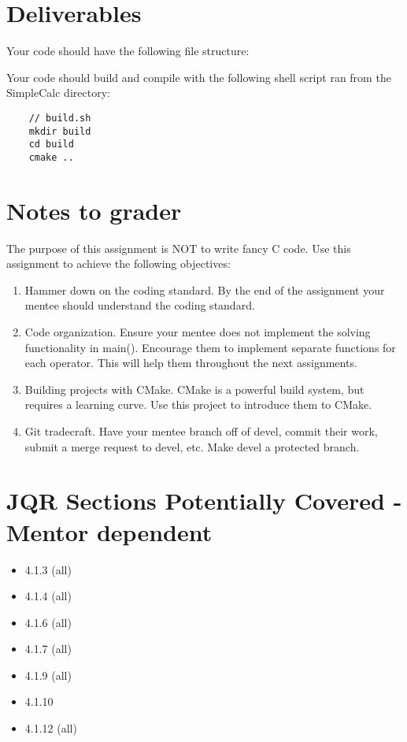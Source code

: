 \documentclass[letterpaper,12pt]{article}
\begin{document}
	\section{Deliverables}
	Your code should have the following file structure:
	\hfill

	Your code should build and compile with the following shell script ran from the SimpleCalc directory:

	\begin{lstlisting}
	// build.sh
	mkdir build
	cd build
	cmake ..
	\end{lstlisting}
	
	
	\section{Notes to grader}
	The purpose of this assignment is NOT to write fancy C code. Use this assignment to achieve the following objectives:
	\begin{enumerate}
		\item Hammer down on the coding standard. By the end of the assignment your mentee should understand the coding standard.
		\item Code organization. Ensure your mentee does not implement the solving functionality in main(). Encourage them to implement separate functions for each operator. This will help them throughout the next assignments.
		\item Building projects with CMake. CMake is a powerful build system, but requires a learning curve. Use this project to introduce them to CMake.
		\item Git tradecraft. Have your mentee branch off of devel, commit their work, submit a merge request to devel, etc. Make devel a protected branch.
	\end{enumerate}

	\section{JQR Sections Potentially Covered - Mentor dependent}
	\begin{itemize}
		\item 4.1.3 (all)
		\item 4.1.4 (all)
		\item 4.1.6 (all)
		\item 4.1.7 (all)
		\item 4.1.9 (all)
		\item 4.1.10
		\item 4.1.12 (all)
	\end{itemize}
	
	
\end{document}
